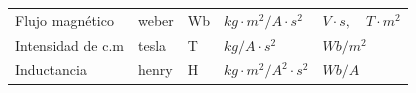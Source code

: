\begin{frame}
\begin{table}[]
{\begin{tabular}{@{}lllll@{}}
                Flujo magnético           & weber           & Wb               & $\unit{kg \cdot m^2 / A \cdot s^2}$   & $\unit{V \cdot s, \quad T \cdot m^2}$ \\
                Intensidad de c.m         & tesla           & T                & $\unit{kg/A \cdot s^2}$               & $\unit{Wb/m^2}$                       \\
                Inductancia               & henry           & H                & $\unit{kg \cdot m^2 / A^2 \cdot s^2}$ & $\unit{Wb/A}$                         \\
                \bottomrule
            \end{tabular}%
        }
    \end{table}
\end{frame}


\begin{frame}{}
    \begin{columns}
        \begin{table}
            \centering
            \caption{Prefijos para potencias de base 10}
\end{table}
\end{columns}
\end{frame}
